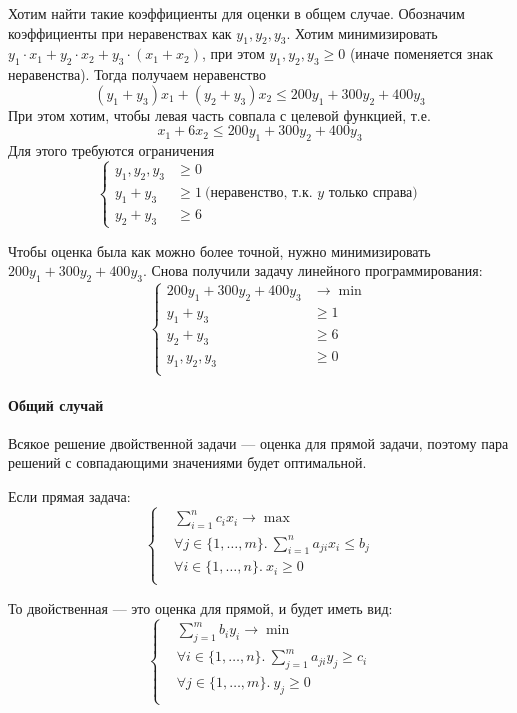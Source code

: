 Хотим найти такие коэффициенты для оценки в общем случае.
Обозначим коэффициенты при неравенствах
как $y_1, y_2, y_3$.
Хотим минимизировать
$y_1 \cdot x_1 + y_2 \cdot x_2 + y_3 \cdot (x_1 + x_2)$,
при этом $y_1, y_2, y_3 \ge 0$
(иначе поменяется знак неравенства).
Тогда получаем неравенство
\[
    (y_1 + y_3) x_1 + (y_2 + y_3) x_2 \le 200 y_1 + 300 y_2 + 400 y_3
\]
При этом хотим, чтобы левая часть совпала с целевой функцией,
т.е.
\[
    x_1 + 6 x_2 \le 200 y_1 + 300 y_2 + 400 y_3
\]
Для этого требуются ограничения
\[
    \left\{
    \begin{aligned}
        y_1, y_2, y_3 & \ge 0 \\
        y_1 + y_3 & \ge 1~\text{(неравенство, т.к. $y$ только справа)} \\
        y_2 + y_3 & \ge 6
    \end{aligned}
    \right.
\]

Чтобы оценка была как можно более точной,
нужно минимизировать $200 y_1 + 300 y_2 + 400 y_3$.
Снова получили задачу линейного программирования:
\[
    \left\{
    \begin{aligned}
        200 y_1 + 300 y_2 + 400 y_3 & \to \min \\
        y_1 + y_3 & \ge 1 \\
        y_2 + y_3 & \ge 6 \\
        y_1, y_2, y_3 & \ge 0 \\
    \end{aligned}
    \right.
\]

\paragraph{Общий случай}
Всякое решение двойственной задачи
--- оценка для прямой задачи,
поэтому пара решений с совпадающими
значениями будет оптимальной.

Если прямая задача:
\[
    \left\{
    \begin{aligned}
        & \sum_{i=1}^n c_i x_i \to \max \\
        & \forall j \in \{1, \ldots, m\}.~\sum_{i=1}^n a_{ji} x_i \le b_j \\
        & \forall i \in \{1, \ldots, n\}.~x_i \ge 0 \\
    \end{aligned}
    \right.
\]

То двойственная --- это оценка для прямой, и будет иметь вид:
\[
    \left\{
    \begin{aligned}
        & \sum_{j=1}^m b_i y_i \to \min \\
        & \forall i \in \{1, \ldots, n\}.~\sum_{j=1}^m a_{ji} y_j \ge c_i \\
        & \forall j \in \{1, \ldots, m\}.~y_j \ge 0 \\
    \end{aligned}
    \right.
\]

